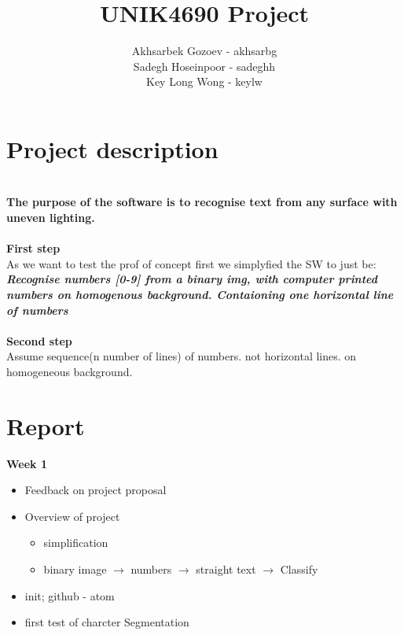 \documentclass[11pt,a4paper,english]{article}
\title{UNIK4690 Project}
\author{
  Akhsarbek Gozoev  - akhsarbg \\
  Sadegh Hoseinpoor - sadeghh\\
  Key Long Wong - keylw
}
\newenvironment{loggentry}[2]%
{\noindent\textbf{#2}\marginnote{#1}\\}{\vspace{0.5cm}}
\begin{document}
\maketitle
\section*{Project description}
\noindent \\ \textbf{The purpose of the software is to recognise text from any
surface with uneven lighting.}
\noindent \\
\noindent \\ \textbf{First step}
\noindent \\ As we want to test the prof of concept first we simplyfied the SW
to just be:
\noindent \\ \textit{\textbf{Recognise numbers [0-9] from a binary img,
with computer printed numbers on homogenous background. Contaioning one
horizontal line of numbers}}
\noindent \\
\noindent \\ \textbf{Second step}
\noindent \\ Assume sequence(n number of lines) of numbers. not horizontal
lines. on homogeneous background.




\newpage
\section*{Report}
\begin{loggentry}{19.04.18}{Week 1}
\begin{itemize}
  \item{Feedback on project proposal}
  \item{Overview of project}
    \begin{itemize}
     \item{simplification}
     \item{binary image $\rightarrow$ numbers $\rightarrow$ straight text $\rightarrow$ Classify}
   \end{itemize}
  \item{init; github - atom}
  \item{first test of charcter Segmentation}
\end{itemize}
\end{loggentry}
\end{document}
